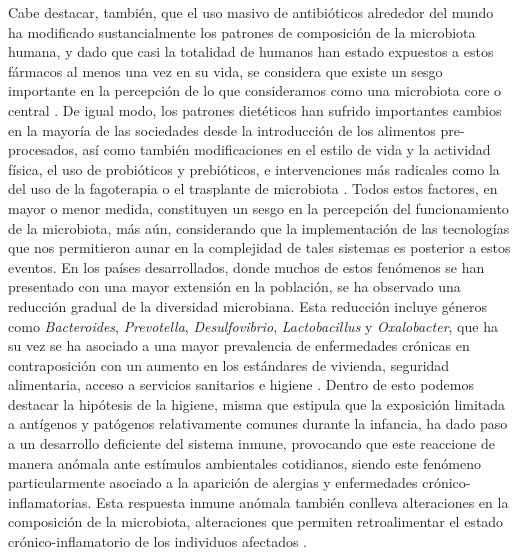 \documentclass[
]{book}
\begin{document}
Cabe destacar, también, que el uso masivo de antibióticos alrededor del mundo ha modificado sustancialmente los patrones de composición de la microbiota humana, y dado que casi la totalidad de humanos han estado expuestos a estos fármacos al menos una vez en su vida, se considera que existe un sesgo importante en la percepción de lo que consideramos como una microbiota core o central \citep{cox2015antibiotics}. De igual modo, los patrones dietéticos han sufrido importantes cambios en la mayoría de las sociedades desde la introducción de los alimentos pre-procesados, así como también modificaciones en el estilo de vida y la actividad física, el uso de probióticos y prebióticos, e intervenciones más radicales como la del uso de la fagoterapia o el trasplante de microbiota \citep{gorski2019perspectives}. Todos estos factores, en mayor o menor medida, constituyen un sesgo en la percepción del funcionamiento de la microbiota, más aún, considerando que la implementación de las tecnologías que nos permitieron aunar en la complejidad de tales sistemas es posterior a estos eventos. En los países desarrollados, donde muchos de estos fenómenos se han presentado con una mayor extensión en la población, se ha observado una reducción gradual de la diversidad microbiana. Esta reducción incluye géneros como \emph{Bacteroides}, \emph{Prevotella}, \emph{Desulfovibrio}, \emph{Lactobacillus} y \emph{Oxalobacter}, que ha su vez se ha asociado a una mayor prevalencia de enfermedades crónicas en contraposición con un aumento en los estándares de vivienda, seguridad alimentaria, acceso a servicios sanitarios e higiene \citep{clemente2015microbiome}. Dentro de esto podemos destacar la hipótesis de la higiene, misma que estipula que la exposición limitada a antígenos y patógenos relativamente comunes durante la infancia, ha dado paso a un desarrollo deficiente del sistema inmune, provocando que este reaccione de manera anómala ante estímulos ambientales cotidianos, siendo este fenómeno particularmente asociado a la aparición de alergias y enfermedades crónico-inflamatorias. Esta respuesta inmune anómala también conlleva alteraciones en la composición de la microbiota, alteraciones que permiten retroalimentar el estado crónico-inflamatorio de los individuos afectados \citep{smits2017seasonal}.
\end{document}
